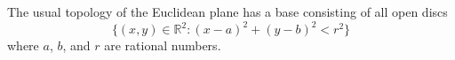 The usual topology of the Euclidean plane has a base consisting of all open discs
$$\{(x, y) \in \mathbb{R}^2 : (x - a)^2 + (y - b)^2 < r^2\}$$
where $a$, $b$, and $r$ are rational numbers.
